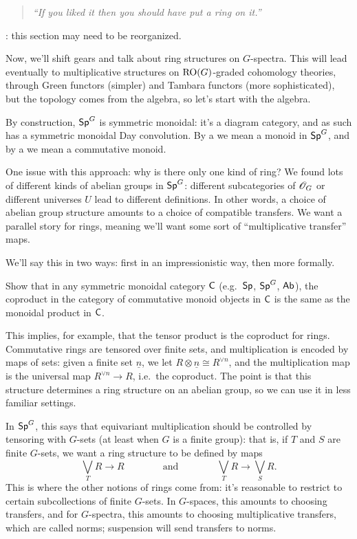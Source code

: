 \begin{quote}\textit{
	``If you liked it then you should have put a ring on it.''
}\end{quote}
\TODO: this section may need to be reorganized.

Now, we'll shift gears and talk about ring structures on $G$-spectra. This will lead eventually to multiplicative
structures on $\mathrm{RO}(G)$-graded cohomology theories, through Green functors (simpler) and Tambara functors (more
sophisticated), but the topology comes from the algebra, so let's start with the algebra.

By construction, $\mathsf{Sp}^G$ is symmetric monoidal: it's a diagram category, and as such has a symmetric monoidal Day
convolution. By a  we mean a monoid in $\mathsf{Sp}^G$, and by a  we
mean a commutative monoid.

One issue with this approach: why is there only one kind of ring? We found lots of different kinds of abelian
groups in $\mathsf{Sp}^G$: different subcategories of $\mathscr O_G$ or different universes $U$ lead to different definitions. In
other words, a choice of abelian group structure amounts to a choice of compatible transfers. We want a parallel
story for rings, meaning we'll want some sort of ``multiplicative transfer'' maps.

We'll say this in two ways: first in an impressionistic way, then more formally.

\begin{ex}
Show that in any symmetric monoidal category $\mathsf C$ (e.g.\ $\mathsf{Sp}$, $\mathsf{Sp}^G$, $\mathsf{Ab}$), the coproduct in the category
of commutative monoid objects in $\mathsf C$ is the same as the monoidal product in $\mathsf C$.
\end{ex}
This implies, for example, that the tensor product is the coproduct for rings.
Commutative rings are tensored over finite sets, and multiplication is encoded by maps of sets: given a finite set
$\underline n$, we let $R\otimes\underline n\cong R^{\lor n}$, and the multiplication map is the universal map
$R^{\vee n}\to R$, i.e.\ the coproduct. The point is that this structure determines a ring structure on an abelian
group, so we can use it in less familiar settings.

In $\mathsf{Sp}^G$, this says that equivariant multiplication should be controlled by tensoring with $G$-sets (at least
when $G$ is a finite group): that is, if $T$ and $S$ are finite $G$-sets, we want a ring structure to be defined by
maps
\[\bigvee_T R\longrightarrow R\qquad\qquad\text{and}\qquad\qquad\bigvee_T
R\longrightarrow\bigvee_S R.\]
This is where the other notions of rings come from: it's reasonable to restrict to certain subcollections of finite
$G$-sets. In $G$-spaces, this amounts to choosing transfers, and for $G$-spectra, this amounts to choosing
multiplicative transfers, which are called norms; suspension will send transfers to norms.

